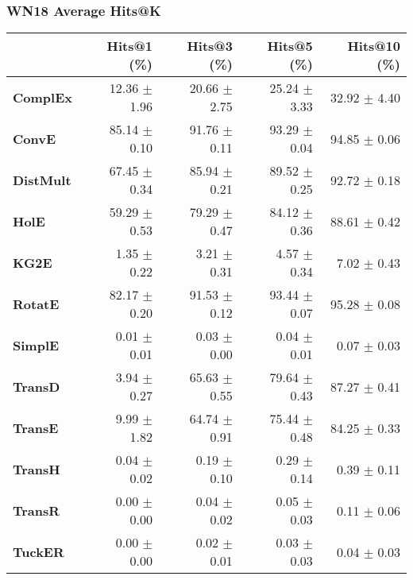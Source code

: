 \documentclass{article}
\begin{document}
\subsubsection{WN18 Average Hits@K}
    \begin{center}
    \begin{tabular}{lrrrr}
\toprule
{} &   Hits@1 (\%) &   Hits@3 (\%) &   Hits@5 (\%) &  Hits@10 (\%) \\
\midrule
\textbf{ComplEx } &  12.36 $\pm$ 1.96 &  20.66 $\pm$ 2.75 &  25.24 $\pm$ 3.33 &  32.92 $\pm$ 4.40 \\
\textbf{ConvE   } &  85.14 $\pm$ 0.10 &  91.76 $\pm$ 0.11 &  93.29 $\pm$ 0.04 &  94.85 $\pm$ 0.06 \\
\textbf{DistMult} &  67.45 $\pm$ 0.34 &  85.94 $\pm$ 0.21 &  89.52 $\pm$ 0.25 &  92.72 $\pm$ 0.18 \\
\textbf{HolE    } &  59.29 $\pm$ 0.53 &  79.29 $\pm$ 0.47 &  84.12 $\pm$ 0.36 &  88.61 $\pm$ 0.42 \\
\textbf{KG2E    } &  $\phantom{5}$1.35 $\pm$ 0.22 &  $\phantom{5}$3.21 $\pm$ 0.31 &  $\phantom{5}$4.57 $\pm$ 0.34 &  $\phantom{5}$7.02 $\pm$ 0.43 \\
\textbf{RotatE  } &  82.17 $\pm$ 0.20 &  91.53 $\pm$ 0.12 &  93.44 $\pm$ 0.07 &  95.28 $\pm$ 0.08 \\
\textbf{SimplE  } &  $\phantom{5}$0.01 $\pm$ 0.01 &  $\phantom{5}$0.03 $\pm$ 0.00 &  $\phantom{5}$0.04 $\pm$ 0.01 &  $\phantom{5}$0.07 $\pm$ 0.03 \\
\textbf{TransD  } &  $\phantom{5}$3.94 $\pm$ 0.27 &  65.63 $\pm$ 0.55 &  79.64 $\pm$ 0.43 &  87.27 $\pm$ 0.41 \\
\textbf{TransE  } &  $\phantom{5}$9.99 $\pm$ 1.82 &  64.74 $\pm$ 0.91 &  75.44 $\pm$ 0.48 &  84.25 $\pm$ 0.33 \\
\textbf{TransH  } &  $\phantom{5}$0.04 $\pm$ 0.02 &  $\phantom{5}$0.19 $\pm$ 0.10 &  $\phantom{5}$0.29 $\pm$ 0.14 &  $\phantom{5}$0.39 $\pm$ 0.11 \\
\textbf{TransR  } &  $\phantom{5}$0.00 $\pm$ 0.00 &  $\phantom{5}$0.04 $\pm$ 0.02 &  $\phantom{5}$0.05 $\pm$ 0.03 &  $\phantom{5}$0.11 $\pm$ 0.06 \\
\textbf{TuckER  } &  $\phantom{5}$0.00 $\pm$ 0.00 &  $\phantom{5}$0.02 $\pm$ 0.01 &  $\phantom{5}$0.03 $\pm$ 0.03 &  $\phantom{5}$0.04 $\pm$ 0.03 \\
\bottomrule
\end{tabular}

    \end{center}
\end{document}
